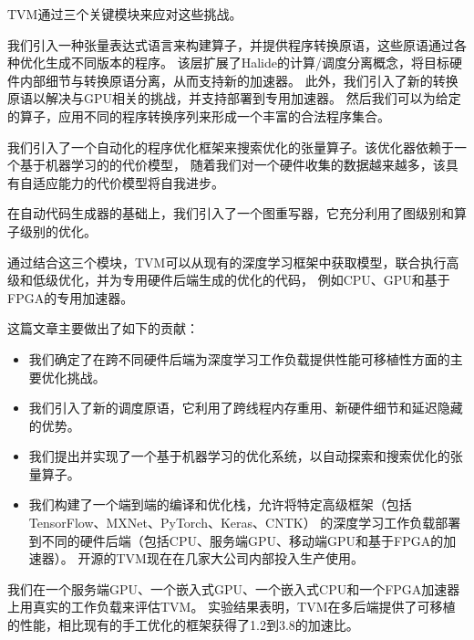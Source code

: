 TVM通过三个关键模块来应对这些挑战。
\begin{enumerate*}
    \item 我们引入一种张量表达式语言来构建算子，并提供程序转换原语，这些原语通过各种优化生成不同版本的程序。
    该层扩展了Halide的计算/调度分离概念，将目标硬件内部细节与转换原语分离，从而支持新的加速器。
    此外，我们引入了新的转换原语以解决与GPU相关的挑战，并支持部署到专用加速器。
    然后我们可以为给定的算子，应用不同的程序转换序列来形成一个丰富的合法程序集合。
    \item 我们引入了一个自动化的程序优化框架来搜索优化的张量算子。该优化器依赖于一个基于机器学习的的代价模型，
    随着我们对一个硬件收集的数据越来越多，该具有自适应能力的代价模型将自我进步。
    \item 在自动代码生成器的基础上，我们引入了一个图重写器，它充分利用了图级别和算子级别的优化。
\end{enumerate*} 

通过结合这三个模块，TVM可以从现有的深度学习框架中获取模型，联合执行高级和低级优化，并为专用硬件后端生成的优化的代码，
例如CPU、GPU和基于FPGA的专用加速器。

这篇文章主要做出了如下的贡献：

\begin{itemize}
    \item 我们确定了在跨不同硬件后端为深度学习工作负载提供性能可移植性方面的主要优化挑战。
    \item 我们引入了新的调度原语，它利用了跨线程内存重用、新硬件细节和延迟隐藏的优势。
    \item 我们提出并实现了一个基于机器学习的优化系统，以自动探索和搜索优化的张量算子。
    \item 我们构建了一个端到端的编译和优化栈，允许将特定高级框架（包括TensorFlow、MXNet、PyTorch、Keras、CNTK）
    的深度学习工作负载部署到不同的硬件后端（包括CPU、服务端GPU、移动端GPU和基于FPGA的加速器）。
    开源的TVM现在在几家大公司内部投入生产使用。
\end{itemize}

我们在一个服务端GPU、一个嵌入式GPU、一个嵌入式CPU和一个FPGA加速器上用真实的工作负载来评估TVM。
实验结果表明，TVM在多后端提供了可移植的性能，相比现有的手工优化的框架获得了1.2到3.8的加速比。
